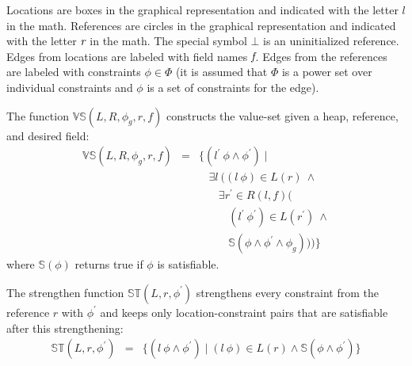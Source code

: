 Locations are boxes in the graphical representation and indicated with
the letter $l$ in the math. References are circles in the graphical
representation and indicated with the letter $\emph{r}$ in the
math. The special symbol $\bot$ is an uninitialized reference. Edges
from locations are labeled with field names $\emph{f}$. Edges from
the references are labeled with constraints $\phi \in \Phi$ (it is
assumed that $\Phi$ is a power set over individual constraints and
$\phi$ is a set of constraints for the edge).

The function $\mathbb{VS}(L,R,\phi_g,r,f)$ constructs the value-set given a
heap, reference, and desired field:
\[
\begin{array}{rcl}
  \mathbb{VS}(L,R,\phi_g,r,f) & = & \{(l^\prime\ \phi\wedge\phi^\prime) \mid \\
  & & \ \ \ \ \exists l\ ((l\ \phi) \in L(r)\ \wedge \\
  & & \ \ \ \ \ \ \ \ \exists r^\prime \in R(l,f) ( \\
  & & \ \ \ \ \ \ \ \ \ \ \ \ (l^\prime\ \phi^\prime) \in L(r^\prime)\ \wedge\\
  & & \ \ \ \ \ \ \ \ \ \ \ \ \mathbb{S}(\phi\wedge\phi^\prime\wedge \phi_g)))\}
\end{array}
\]
where $\mathbb{S}(\phi)$ returns true if $\phi$ is satisfiable.

The strengthen function $\mathbb{ST}(L,r,\phi^\prime)$ strengthens every
constraint from the reference $r$ with $\phi^\prime$ and keeps only location-constraint
pairs that are satisfiable after this strengthening:
\[
\begin{array}{rcl} 
\mathbb{ST}(L,r,\phi^\prime) & = & \{ (l\ \phi\wedge\phi^\prime) \mid 
(l\ \phi)\in L(r)\wedge\mathbb{S}(\phi\wedge\phi^\prime) \}
\end{array}
\]






